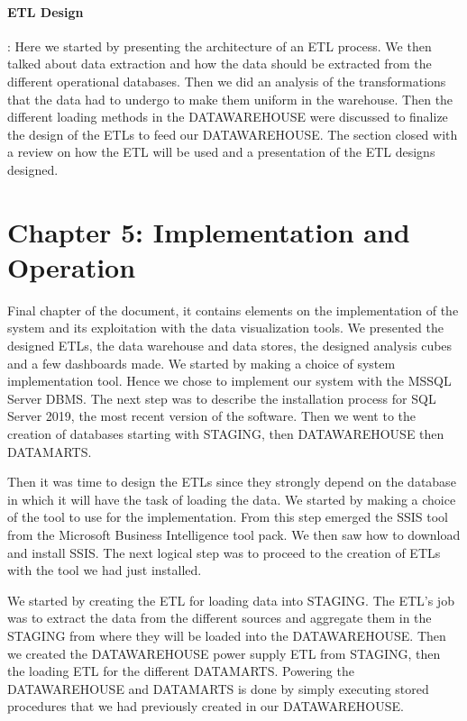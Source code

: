 \paragraph{ETL Design}: Here we started by presenting the architecture of an ETL process. We then talked about data extraction and how the data should be extracted from the different operational databases. Then we did an analysis of the transformations that the data had to undergo to make them uniform in the warehouse. Then the different loading methods in the DATAWAREHOUSE were discussed to finalize the design of the ETLs to feed our DATAWAREHOUSE. The section closed with a review on how the ETL will be used and a presentation of the ETL designs designed.


\section*{Chapter 5: Implementation and Operation}
Final chapter of the document, it contains elements on the implementation of the system and its exploitation with the data visualization tools. We presented the designed ETLs, the data warehouse and data stores, the designed analysis cubes and a few dashboards made. We started by making a choice of system implementation tool. Hence we chose to implement our system with the MSSQL Server DBMS. The next step was to describe the installation process for SQL Server 2019, the most recent version of the software. Then we went to the creation of databases starting with STAGING, then DATAWAREHOUSE then DATAMARTS.

Then it was time to design the ETLs since they strongly depend on the database in which it will have the task of loading the data. We started by making a choice of the tool to use for the implementation. From this step emerged the SSIS tool from the Microsoft Business Intelligence tool pack. We then saw how to download and install SSIS. The next logical step was to proceed to the creation of ETLs with the tool we had just installed.

We started by creating the ETL for loading data into STAGING. The ETL's job was to extract the data from the different sources and aggregate them in the STAGING from where they will be loaded into the DATAWAREHOUSE. Then we created the DATAWAREHOUSE power supply ETL from STAGING, then the loading ETL for the different DATAMARTS. Powering the DATAWAREHOUSE and DATAMARTS is done by simply executing stored procedures that we had previously created in our DATAWAREHOUSE.

